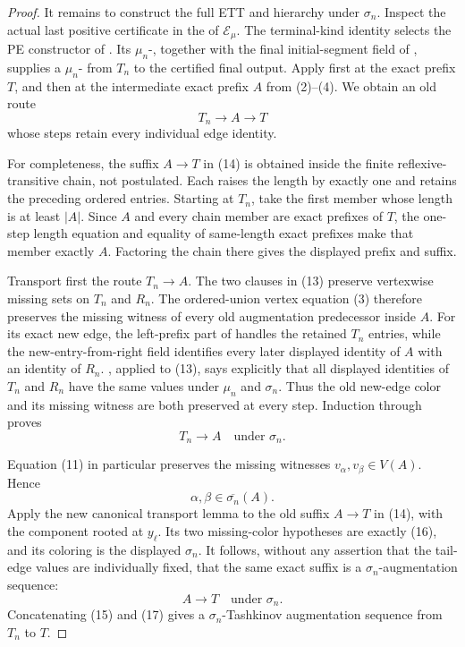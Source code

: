 \begin{proof}
It remains to construct the full ETT and hierarchy under \(\sigma_n\).
Inspect the actual last positive certificate in the
 of \(\mathcal E_\mu\).  The terminal-kind
identity selects the PE constructor of
.  Its
\(\mu_n\)-, together with the final
initial-segment field of , supplies a
\(\mu_n\)- from \(T_n\) to the
certified final output.  Apply
 first at the exact prefix
\(T\), and then at the intermediate exact prefix \(A\) from
(2)--(4).  We obtain an old route
\[
            T_n\longrightarrow A\longrightarrow T             \tag{14}
\]
whose steps retain every individual edge identity.

For completeness, the suffix \(A\to T\) in (14) is obtained inside the
finite reflexive-transitive chain, not postulated.  Each
 raises the length by exactly one and
retains the preceding ordered entries.  Starting at \(T_n\), take the
first member whose length is at least \(|A|\).  Since \(A\) and every
chain member are exact prefixes of \(T\), the one-step length equation
and equality of same-length exact prefixes make that member exactly
\(A\).  Factoring the chain there gives the displayed prefix and suffix.

Transport first the route \(T_n\to A\).  The two
 clauses in (13) preserve vertexwise missing sets
on \(T_n\) and \(R_n\).  The ordered-union vertex equation (3) therefore
preserves the missing witness of every old augmentation predecessor
inside \(A\).  For its exact new edge, the left-prefix part of
 handles the retained \(T_n\) entries, while
the new-entry-from-right field identifies every later displayed identity
of \(A\) with an identity of \(R_n\).
, applied to (13), says explicitly
that all displayed identities of \(T_n\) and \(R_n\) have the same values
under \(\mu_n\) and \(\sigma_n\).  Thus the old new-edge color and its
missing witness are both preserved at every step.  Induction through
 proves
\[
                  T_n\longrightarrow A
                  \quad\text{under }\sigma_n.                  \tag{15}
\]

Equation (11) in particular preserves the missing witnesses
\(v_\alpha,v_\beta\in V(A)\).  Hence
\[
       \alpha,\beta\in\overline{\sigma_n}(A).                  \tag{16}
\]
Apply the new canonical transport lemma
 to the old suffix
\(A\to T\) in (14), with the component rooted at \(y_\ell\).
Its two missing-color hypotheses are exactly (16), and its coloring is
the displayed \(\sigma_n\).  It follows, without any assertion that the
tail-edge values are individually fixed, that the same exact suffix is a
\(\sigma_n\)-augmentation sequence:
\[
                  A\longrightarrow T
                  \quad\text{under }\sigma_n.                  \tag{17}
\]
Concatenating (15) and (17) gives a
\(\sigma_n\)-Tashkinov augmentation sequence from \(T_n\) to \(T\).


\end{proof}
